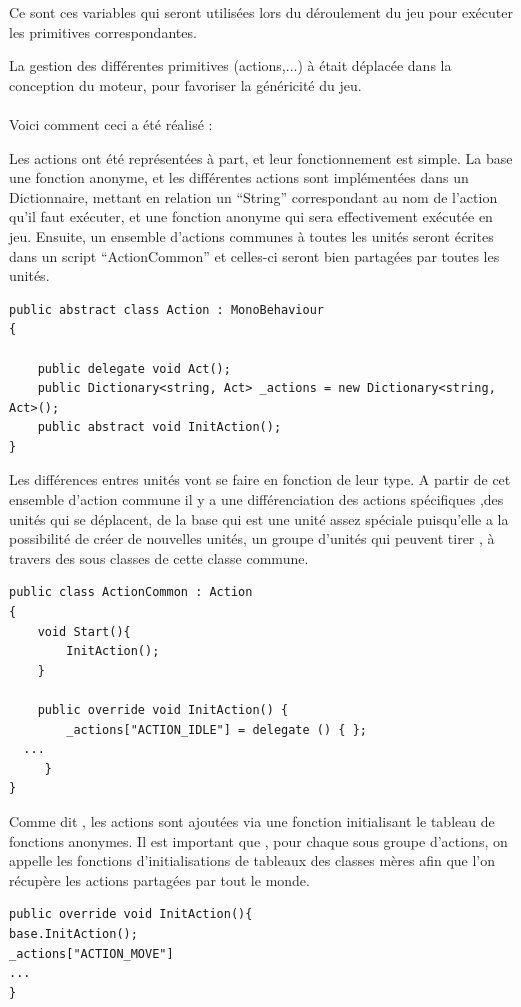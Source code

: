 \documentclass{report}
\begin{document}
Ce sont ces variables qui seront utilisées lors du déroulement du jeu pour exécuter les primitives correspondantes.

La gestion des différentes primitives (actions,...) à était déplacée dans la conception du moteur, pour favoriser la généricité du jeu.
\paragraph{}
Voici comment ceci a été réalisé : 

Les actions ont été représentées à part, et leur fonctionnement est simple. La base une fonction anonyme, et les différentes actions sont implémentées dans un Dictionnaire, mettant en relation un “String” correspondant au nom de l’action qu’il faut exécuter, et une fonction anonyme qui sera effectivement exécutée en jeu. Ensuite, un ensemble d’actions communes à toutes les unités seront écrites dans un script “ActionCommon” et celles-ci seront bien partagées par toutes les unités. 

\begin{lstlisting}[frame=single]
public abstract class Action : MonoBehaviour
{

    public delegate void Act();
    public Dictionary<string, Act> _actions = new Dictionary<string, Act>();
    public abstract void InitAction();
}
\end{lstlisting}

Les différences entres unités vont se faire en fonction de leur type. A partir de cet ensemble d’action commune il y a une différenciation des actions spécifiques ,des unités qui se déplacent, de la base qui est une unité assez spéciale puisqu’elle a la possibilité de créer de nouvelles unités,  un groupe d’unités qui peuvent tirer , à travers des sous classes de cette classe commune.

\begin{lstlisting}[frame=single]
public class ActionCommon : Action
{
    void Start(){
        InitAction();
    }

    public override void InitAction() {
        _actions["ACTION_IDLE"] = delegate () { };
  ...
     }
}
\end{lstlisting}

Comme dit , les actions sont ajoutées via une fonction initialisant le tableau de fonctions anonymes. Il est important que , pour chaque sous groupe d’actions, on appelle les fonctions d’initialisations de tableaux des classes mères afin que l’on récupère les actions partagées par tout le monde.
\begin{lstlisting}[frame=single]
  public override void InitAction(){
base.InitAction();
_actions["ACTION_MOVE"] 
...
}
\end{lstlisting}
\end{document}
